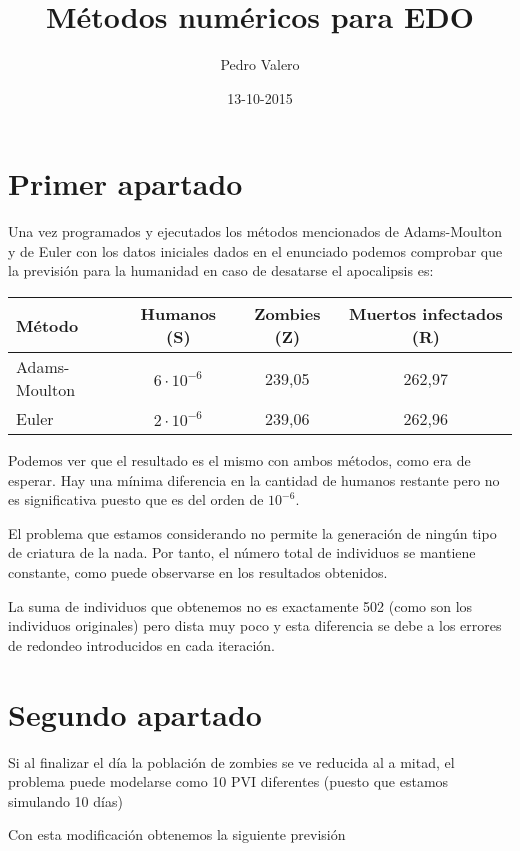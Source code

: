 \documentclass[nochap]{apuntes}
\title{Métodos numéricos para EDO}
\author{Pedro Valero}
\date{13-10-2015}
\begin{document}
\pagestyle{plain}

\section{Primer apartado}
Una vez programados y ejecutados los métodos mencionados de Adams-Moulton y de Euler con los datos iniciales dados en el enunciado podemos comprobar que la previsión para la humanidad en caso de desatarse el apocalipsis es:

\begin{center}
\begin{tabular}{lccc}    \toprule
Método    & Humanos (S)  & Zombies (Z)  & Muertos infectados (R)  \\ \midrule
Adams-Moulton & $6 \cdot 10^{-6}$ & 239,05 & 262,97\\
Euler & $2 \cdot 10^{-6}$ & 239,06 & 262,96\\\bottomrule
 \hline
\end{tabular}
\end{center}

Podemos ver que el resultado es el mismo con ambos métodos, como era de esperar. Hay una mínima diferencia en la cantidad de humanos restante pero no es significativa puesto que es del orden de $10^{-6}$.

El problema que estamos considerando no permite la generación de ningún tipo de criatura de la nada. Por tanto, el número total de individuos se mantiene constante, como puede observarse en los resultados obtenidos.

La suma de individuos que obtenemos no es exactamente 502 (como son los individuos originales) pero dista muy poco y esta diferencia se debe a los errores de redondeo introducidos en cada iteración.

\section{Segundo apartado}

Si al finalizar el día la población de zombies se ve reducida al a mitad, el problema puede modelarse como 10 PVI diferentes (puesto que estamos simulando 10 días)

Con esta modificación obtenemos la siguiente previsión
\end{document}
